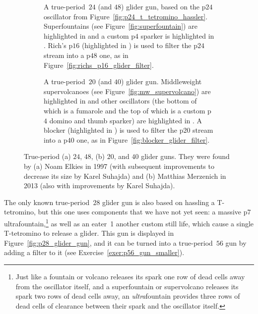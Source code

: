 \begin{figure}[!htb]
	\centering
	\begin{subfigure}{0.41\textwidth}
		\centering
		\caption{A true-period~$24$ (and $48$) glider gun, based on the p$24$ oscillator from Figure~\ref{fig:p24_t_tetromino_hassler}. Superfountains (see Figure~\ref{fig:superfountain}) are highlighted in  and a custom p$4$ sparker is highlighted in . Rich's p$16$ (highlighted in ) is used to filter the p$24$ stream into a p$48$ one, as in Figure~\ref{fig:richs_p16_glider_filter}.}
		\label{fig:p24_glider_gun}
	\end{subfigure} \hfill \begin{subfigure}{0.56\textwidth}
		\centering\vspace*{0.15cm}
		\caption{A true-period~$20$ (and $40$) glider gun. Middleweight supervolcanoes (see Figure~\ref{fig:mw_supervolcano}) are highlighted in  and other oscillators (the bottom of which is a fumarole and the top of which is a custom p$4$ domino and thumb sparker) are highlighted in . A blocker (highlighted in ) is used to filter the p$20$ stream into a p$40$ one, as in Figure~\ref{fig:blocker_glider_filter}.}
		\label{fig:p20_glider_gun}
	\end{subfigure}
	\caption{True-period (a) $24$, $48$, (b) $20$, and $40$ glider guns. They were found by (a) Noam Elkies in 1997 (with subsequent improvements to decrease its size by Karel Suhajda) and (b) Matthias Merzenich in 2013 (also with improvements by Karel Suhajda).}\label{fig:p20_24_guns}
\end{figure}

The only known true-period~$28$ glider gun is also based on hassling a T-tetromino, but this one uses components that we have not yet seen: a massive p7 ultrafountain,\footnote{Just like a fountain or volcano releases its spark one row of dead cells away from the oscillator itself, and a superfountain or supervolcano releases its spark two rows of dead cells away, an \emph{ultra}fountain provides three rows of dead cells of clearance between their spark and the oscillator itself.} as well as an eater~1 another custom still life, which cause a single T-tetromino to release a glider. This gun is displayed in Figure~\ref{fig:p28_glider_gun}, and it can be turned into a true-period~$56$ gun by adding a filter to it (see Exercise~\ref{exer:p56_gun_smaller}).

